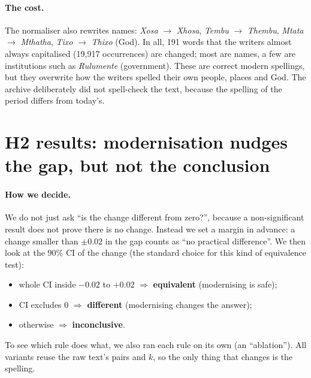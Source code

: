 \documentclass[11pt,a4paper]{article}
\begin{document}
\paragraph{The cost.} The normaliser also rewrites names: \emph{Xosa} $\to$ \emph{Xhosa},
\emph{Tembu} $\to$ \emph{Thembu}, \emph{Mtata} $\to$ \emph{Mthatha}, \emph{Tixo} $\to$ \emph{Thixo}
(God). In all, 191 words that the writers almost always capitalised (19{,}917 occurrences) are changed;
most are names, a few are institutions such as \emph{Rulumente} (government). These are correct modern spellings, but
they overwrite how the writers spelled their own people, places and God. The archive deliberately did
not spell-check the text, because the spelling of the period differs from today's.

\section{H2 results: modernisation nudges the gap, but not the conclusion}

\paragraph{How we decide.} We do not just ask ``is the change different from zero?'', because a
non-significant result does not prove there is no change. Instead we set a margin in advance: a change
smaller than $\pm 0.02$ in the gap counts as ``no practical difference''. We then look at the 90\% CI of
the change (the standard choice for this kind of equivalence test):
\begin{itemize}
  \item whole CI inside $-0.02$ to $+0.02$ $\Rightarrow$ \textbf{equivalent} (modernising is safe);
  \item CI excludes 0 $\Rightarrow$ \textbf{different} (modernising changes the answer);
  \item otherwise $\Rightarrow$ \textbf{inconclusive}.
\end{itemize}
To see which rule does what, we also ran each rule on its own (an ``ablation''). All variants reuse the
raw text's pairs and $k$, so the only thing that changes is the spelling.
\end{document}

